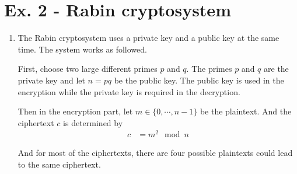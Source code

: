 \documentclass[11pt,a4paper]{article}
\begin{document}
\section*{Ex. 2 - Rabin cryptosystem}
\begin{enumerate}
	\item The Rabin cryptosystem uses a private key and a public key at the same time. The system works as followed.
	\par First, choose two large different primes $p$ and $q$. The primes $p$ and $q$ are the private key and let $n = pq$ be the public key. The public key is used in the encryption while the private key is required in the decryption.
	\par Then in the encryption part, let $m \in \{ 0, \cdots, n-1 \}$ be the plaintext. And the ciphertext $c$ is determined by
		\begin{align*}
			c &= m^{2} \mod n
		\end{align*}
	\par And for most of the ciphertexts, there are four possible plaintexts could lead to the same ciphertext.

\end{enumerate}
\end{document}
